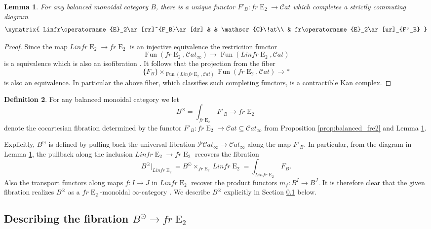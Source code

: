 \documentclass[reqno]{amsart}
\newtheorem{lemma}{Lemma}[section]
\theoremstyle{definition}
\newtheorem{definition}[lemma]{Definition}
\newcommand{\msc}[1]{\mathscr{#1}}
\newcommand{\opn}[1]{\operatorname{#1}}
\newcommand{\sCat}{\msc{C}\!at}
\DeclareMathOperator{\Fun}{Fun}
\renewcommand{\1}{\mathbf{1}}
\begin{document}
\begin{lemma}\label{lem:6017}
For any balanced monoidal category $B$, there is a unique functor $F'_B:fr\opn{E}_2\to \sCat$ which completes a strictly commuting diagram
\[
\xymatrix{
Linfr\opn{E}_2\ar[rr]^{F_B}\ar[dr] & & \sCat\\
	& fr\opn{E}_2\ar[ur]_{F'_B}
}
\] 
\end{lemma}

\begin{proof}
Since the map $Linfr\opn{E}_2\to fr\opn{E}_2$ is an injective equivalence the restriction functor
\[
\Fun(fr\opn{E}_2,\sCat_{\infty})\to \Fun(Linfr\opn{E}_2,\sCat)
\]
is a equivalence which is also an isofibration \cite[\href{https://kerodon.net/tag/01F3}{01F3}]{kerodon}. It follows that the projection from the fiber
\[
\{F_B\}\times_{\Fun(Linfr\opn{E}_2,\sCat)}\Fun(fr\opn{E}_2,\sCat)\to \ast
\]
is also an equivalence.  In particular the above fiber, which classifies such completing functors, is a contractible Kan complex.
\end{proof}

\begin{definition}\label{def:balanced_ot}
For any balanced monoidal category we let
\[
B^{\odot}=\int_{fr\opn{E}_2}F'_B\to fr\opn{E}_2
\]
denote the cocartesian fibration determined by the functor $F'_B:fr\opn{E}_2\to \sCat\subseteq \sCat_{\infty}$ from Proposition \ref{prop:balanced_fre2} and Lemma \ref{lem:6017}.
\end{definition}

Explicitly, $B^{\odot}$ is defined by pulling back the universal fibration $\msc{P}\!\sCat_{\infty}\to \sCat_{\infty}$ along the map $F'_B$.  In particular, from the diagram in Lemma \ref{lem:6017}, the pullback along the inclusion $Linfr\opn{E}_2\to fr\opn{E}_2$ recovers the fibration
\[
B^{\odot}|_{Linfr\opn{E}_2}=B^{\odot}\times_{fr\opn{E}_2}Linfr\opn{E}_2=\int_{Linfr\opn{E}_2}F_B.
\]
Also the transport functors along maps $f:I\to J$ in $Linfr\opn{E}_2$ recover the product functors $m_f:B^I\to B^J$.  It is therefore clear that the given fibration realizes $B^{\odot}$ as a $fr\opn{E}_2$-monoidal $\infty$-category \cite[Definition 2.1.2.13]{ha}.  We describe $B^{\odot}$ explicitly in Section \ref{sect:bal_description} below.


\subsection{Describing the fibration $B^{\odot}\to fr\opn{E}_2$}
\label{sect:bal_description}
\end{document}
